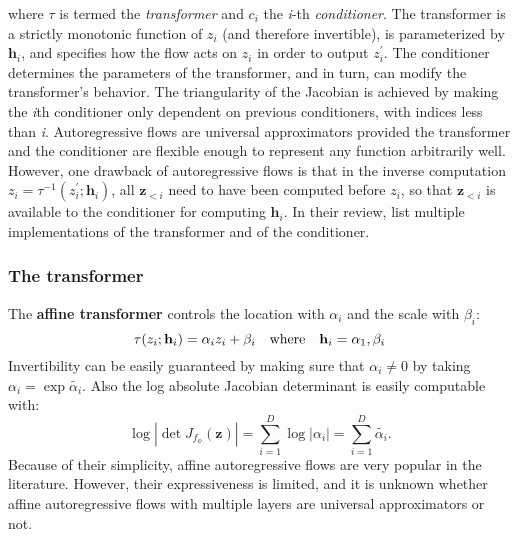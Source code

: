 \documentclass[english]{scrartcl}
\begin{document}
    where $\tau$ is termed the \textit{transformer} and $c_i$ the \textit{i}-th \textit{conditioner}.
    The transformer is a strictly monotonic function of $z_i$ (and therefore invertible), is parameterized by $\textbf{h}_i$, and specifies how the flow acts on $z_i$ in order to output $z_i^{\prime}$.
    The conditioner determines the parameters of the transformer, and in turn, can modify the transformer's behavior.
    The triangularity of the Jacobian is achieved by making the \textit{i}th conditioner only dependent on previous conditioners, with indices less than \textit{i}.
    Autoregressive flows are universal approximators provided the transformer and the conditioner are flexible enough to represent any function arbitrarily well.
    However, one drawback of autoregressive flows is that in the inverse computation $z_i = \tau ^{-1} (z_i ^{\prime}; \textbf{h}_i)$, all $\textbf{z}_{<i}$ need to have been computed before $z_i$, so that $\textbf{z}_{<i}$ is available to the conditioner for computing $\textbf{h}_i$.
    In their review, \cite{papamakarios_normalizing_2019} list multiple implementations of the transformer and of the conditioner.

    \subsubsection{The transformer}

    The \textbf{affine transformer} controls the location with $\alpha_i$ and the scale with $\beta_i$:
    \begin{equation}
        \tau(z_i;\textbf{h}_i) = \alpha_i z_i +\beta _i \quad \text{where} \quad \textbf{h}_i = {\alpha_1, \beta_i}
    \end{equation}
    Invertibility can be easily guaranteed by making sure that $\alpha _i \neq 0$ by taking $\alpha _i = \exp \tilde{\alpha _i}$.
    Also the log absolute Jacobian determinant is easily computable with:
    \begin{equation}
        \log |\det J_{f_\phi}(\textbf{z})| = \sum _{i=1} ^{D} \log |\alpha _i| = \sum _{i=1} ^{D} \tilde{\alpha _i}.
    \end{equation}
    Because of their simplicity, affine autoregressive flows are very popular in the literature.
    However, their expressiveness is limited, and it is unknown whether affine autoregressive flows with multiple layers are universal approximators or not.
\end{document}
